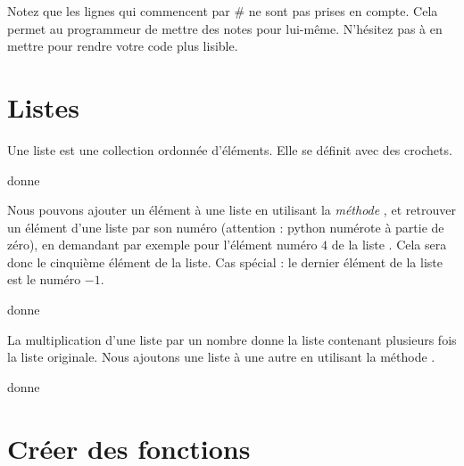 Notez que les lignes qui commencent par \# ne sont pas prises en compte. Cela permet au programmeur de mettre des notes pour lui-même. N'hésitez pas à en mettre pour rendre votre code plus lisible.


\section{Listes}

Une liste est une collection ordonnée d'éléments. Elle se définit avec des crochets.



donne



Nous pouvons ajouter un élément à une liste en utilisant la \emph{méthode} , et retrouver un élément d'une liste par son numéro (attention : python numérote à partie de zéro), en demandant par exemple  pour l'élément numéro \( 4\) de la liste . Cela sera donc le cinquième élément de la liste. Cas spécial : le dernier élément de la liste est le numéro \( -1\).



donne






La multiplication d'une liste par un nombre donne la liste contenant plusieurs fois la liste originale. Nous ajoutons une liste à une autre en utilisant la méthode .




donne





\section{Créer des fonctions}

